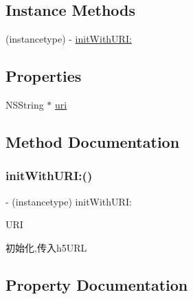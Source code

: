 \subsection*{Instance Methods}
\begin{DoxyCompactItemize}
\item 
(instancetype) -\/ \mbox{\hyperlink{interface_a_l_p_t_b_u_r_i_param_a2d56fd99bb62926aa685252d779fda80}{init\+With\+U\+R\+I\+:}}
\end{DoxyCompactItemize}
\subsection*{Properties}
\begin{DoxyCompactItemize}
\item 
N\+S\+String $\ast$ \mbox{\hyperlink{interface_a_l_p_t_b_u_r_i_param_a6da79f0af540257717b7afd29a828d51}{uri}}
\end{DoxyCompactItemize}


\subsection{Method Documentation}
\mbox{\label{interface_a_l_p_t_b_u_r_i_param_a2d56fd99bb62926aa685252d779fda80}} 
\subsubsection{\texorpdfstring{init\+With\+U\+R\+I\+:()}{initWithURI:()}}
{\footnotesize\ttfamily -\/ (instancetype) init\+With\+U\+R\+I\+: \begin{DoxyParamCaption}\item[{(N\+S\+String $\ast$)}]{U\+RI }\end{DoxyParamCaption}}

初始化,传入h5\+U\+RL 

\subsection{Property Documentation}
\mbox{\label{interface_a_l_p_t_b_u_r_i_param_a6da79f0af540257717b7afd29a828d51}} 
